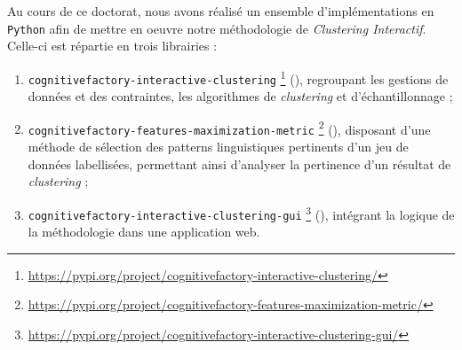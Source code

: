 		Au cours de ce doctorat, nous avons réalisé un ensemble d'implémentations en \texttt{Python} afin de mettre en oeuvre notre méthodologie de \textit{Clustering Interactif}.
		Celle-ci est répartie en trois librairies :
		\begin{enumerate}
			\item \texttt{cognitivefactory-interactive-clustering} \footnote{
				\url{https://pypi.org/project/cognitivefactory-interactive-clustering/}
			} (\cite{schild:2022:cognitivefactory-interactiveclustering}), regroupant les gestions de données et des contraintes, les algorithmes de \textit{clustering} et d'échantillonnage ;
			\item \texttt{cognitivefactory-features-maximization-metric} \footnote{
				\url{https://pypi.org/project/cognitivefactory-features-maximization-metric/}
			} (\cite{schild:2023:cognitivefactory-featuresmaximizationmetric}), disposant d'une méthode de sélection des patterns linguistiques pertinents d'un jeu de données labellisées, permettant ainsi d'analyser la pertinence d'un résultat de \textit{clustering} ;
			\item \texttt{cognitivefactory-interactive-clustering-gui} \footnote{
				\url{https://pypi.org/project/cognitivefactory-interactive-clustering-gui/}
			} (\cite{schild-etal:2022:cognitivefactory-interactiveclusteringgui}), intégrant la logique de la méthodologie dans une application web.
		\end{enumerate}
		
